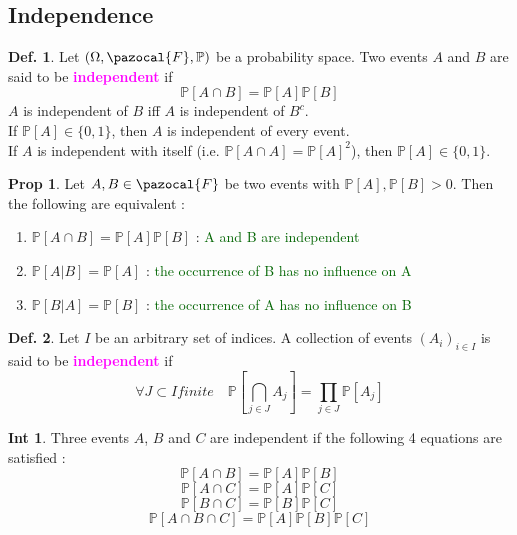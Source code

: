 \documentclass[8pt,a4paper,landscape]{article}
\theoremstyle{definition}
\newtheorem{definition}{Def.}[section]
\theoremstyle{example}
\theoremstyle{intuition}
\newtheorem*{intuition}{Int}
\theoremstyle{definition}
\newtheorem{proposition}{Prop}[section]
\newcommand{\Fb}{\pazocal{F}}
\newcommand{\mydef}[1]{\textcolor{magenta}{\textbf{#1}}}
\newcommand{\prob}[1]{\mathbb{P}\left[ #1 \right]}
\begin{document}
\begin{multicols}{3}
				
			\subsection{Independence}
			
				\begin{definition}
					Let $(\Omega, \Fb, \mathbb{P})$ be a probability space. Two events $A$ and $B$ are said to be \mydef{independent} if 
					$$
						\prob{A \cap B} = \prob{A} \prob{B}
					$$
					$A$ is independent of $B$ iff $A$ is independent of $B^c$. \\
					If $\prob{A} \in \{0,1\}$, then $A$ is independent of every event. \\
					If $A$ is independent with itself (i.e. $\prob{A \cap A} = \prob{A}^2$), then $\prob{A} \in \{0, 1\}$.
				\end{definition}
				
				\begin{proposition}
					Let $A, B \in \Fb$ be two events with $\prob{A}, \prob{B} > 0$. Then the following are equivalent :
					\begin{enumerate}[label=\roman*.]
						\item $\prob{A \cap B} = \prob{A} \prob{B}$ : \textcolor{DarkGreen}{A and B are independent}
						\item $\prob{A \lvert B} = \prob{A}$ : \textcolor{DarkGreen}{the occurrence of B has no influence on A}
						\item $\prob{B \lvert A} = \prob{B}$ : \textcolor{DarkGreen}{the occurrence of A has no influence on B}
					\end{enumerate} 
				\end{proposition}
				
				\begin{definition}
					Let $I$ be an arbitrary set of indices. A collection of events $(A_i)_{i \in I}$ is said to be \mydef{independent} if 
					$$
						\forall J \subset I finite \quad \prob{\bigcap\limits_{j \in J} A_j} = \prod_{j \in J} \prob{A_j}
					$$
				\end{definition}
				
				\begin{intuition}
					Three events $A$, $B$ and $C$ are independent if the following 4 equations are satisfied :
						$$\prob{A \cap B} = \prob{A} \prob{B} $$
						$$\prob{A \cap C} = \prob{A} \prob{C} $$
						$$\prob{B \cap C} = \prob{B} \prob{C} $$
						$$\prob{A \cap B \cap C} = \prob{A}\prob{B}\prob{C}$$
				\end{intuition}



\end{multicols}
\end{document}
